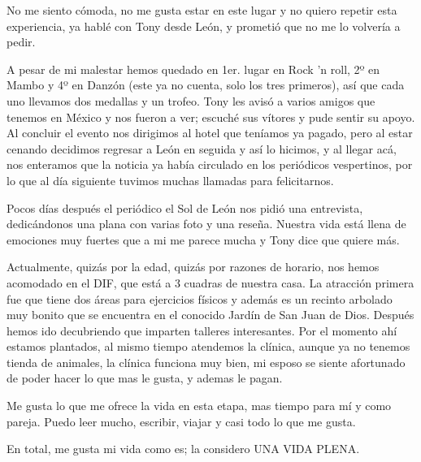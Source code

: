 \documentclass[letterpaper, 12pt]{book}
\begin{document}
No me siento cómoda, no me gusta estar en este lugar y no quiero repetir esta experiencia, ya hablé con Tony desde León, y prometió que no me lo volvería a pedir. 

A pesar de mi malestar hemos quedado en 1er. lugar en Rock 'n roll, 2º en Mambo y 4º en Danzón (este ya no cuenta, solo los tres primeros), así que cada uno llevamos dos medallas y un trofeo. Tony les avisó a varios amigos que tenemos en México y nos fueron a ver; escuché sus vítores y pude sentir su apoyo. Al concluir el evento nos dirigimos al hotel que teníamos ya pagado, pero al estar cenando decidimos regresar a León en seguida y así lo hicimos, y al llegar acá, nos enteramos que la noticia ya había circulado en los periódicos vespertinos, por lo que al día siguiente tuvimos muchas llamadas para felicitarnos.

Pocos días después el periódico el Sol de León nos pidió una entrevista, dedicándonos una plana con varias foto y una reseña.
Nuestra vida está llena de emociones muy fuertes que a mi me parece mucha y Tony dice que quiere más.

Actualmente, quizás por la edad, quizás por razones de horario, nos hemos acomodado en el DIF, que está a 3 cuadras de nuestra casa. La atracción primera fue que tiene dos áreas para ejercicios físicos y además es un recinto arbolado muy bonito que se encuentra en el conocido Jardín de San Juan de Dios. Después hemos ido decubriendo que imparten talleres interesantes. Por el momento ahí estamos plantados, al mismo tiempo atendemos la clínica, aunque ya no tenemos tienda de animales, la clínica funciona muy bien, mi esposo se siente afortunado de poder hacer lo que mas le gusta, y ademas le pagan.

Me gusta lo que me ofrece la vida en esta etapa, mas tiempo para mí y como pareja. Puedo leer mucho, escribir, viajar y casi todo lo que me gusta.

En total, me gusta mi vida como es; la  considero UNA VIDA PLENA.
\end{document}
